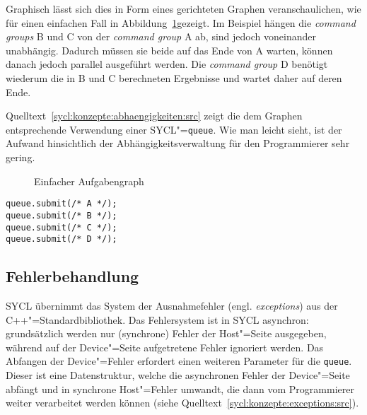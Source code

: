 Graphisch lässt sich dies in Form eines gerichteten Graphen veranschaulichen,
wie für einen einfachen Fall in
Abbildung~\ref{sycl:konzepte:abhaengigkeiten:graph}gezeigt. Im Beispiel hängen
die \textit{command groups} B und C von der \textit{command group} A ab, sind
jedoch voneinander unabhängig. Dadurch müssen sie beide auf das Ende von A
warten, können danach jedoch parallel ausgeführt werden. Die
\textit{command group} D benötigt wiederum die in B und C berechneten
Ergebnisse und wartet daher auf deren Ende.

Quelltext~\ref{sycl:konzepte:abhaengigkeiten:src} zeigt die dem Graphen
entsprechende Verwendung einer SYCL"=\texttt{queue}. Wie man leicht sieht, ist
der Aufwand hinsichtlich der Abhängigkeitsverwaltung für den Programmierer sehr
gering.

\begin{figure}
    \centering
    \caption{Einfacher Aufgabengraph}
    \label{sycl:konzepte:abhaengigkeiten:graph}
\end{figure}

\begin{code}
    \begin{verbatim}
queue.submit(/* A */);
queue.submit(/* B */);
queue.submit(/* C */);
queue.submit(/* D */);
    \end{verbatim}
    \caption{Einfacher SYCL-Aufgabengraph}
    \label{sycl:konzepte:abhaengigkeiten:src}
\end{code}

\subsection{Fehlerbehandlung}

SYCL übernimmt das System der Ausnahmefehler (engl. \textit{exceptions}) aus
der C++"=Standardbibliothek. Das Fehlersystem ist in SYCL asynchron:
grundsätzlich werden nur (synchrone) Fehler der Host"=Seite ausgegeben, während
auf der Device"=Seite aufgetretene Fehler ignoriert werden. Das Abfangen der
Device"=Fehler erfordert einen weiteren Parameter für die \texttt{queue}. Dieser
ist eine Datenstruktur, welche die asynchronen Fehler der Device"=Seite abfängt
und in synchrone Host"=Fehler umwandt, die dann vom Programmierer weiter
verarbeitet werden können (siehe Quelltext~\ref{sycl:konzepte:exceptions:src}).


